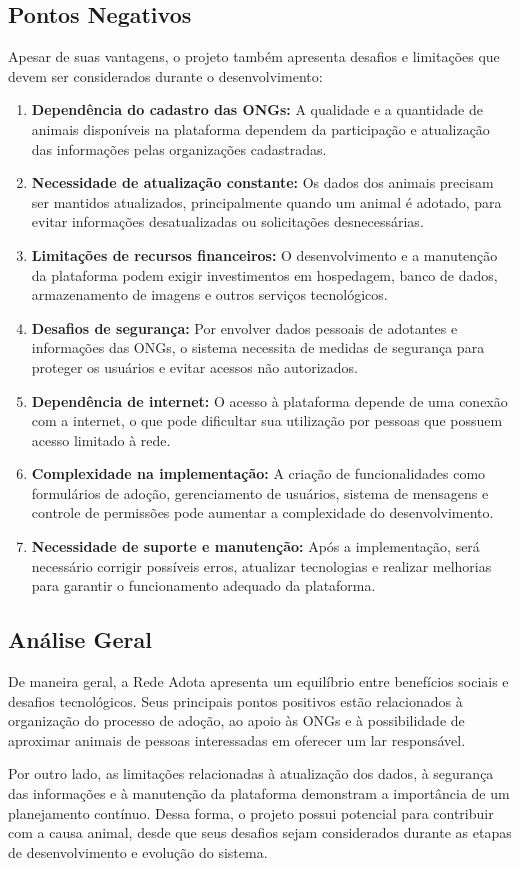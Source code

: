 \documentclass[12pt,a4paper]{article}
\begin{document}
\subsection{Pontos Negativos}
Apesar de suas vantagens, o projeto também apresenta desafios e limitações que devem ser considerados durante o desenvolvimento:
\begin{enumerate}[leftmargin=*]
    \item \textbf{Dependência do cadastro das ONGs:} A qualidade e a quantidade de animais disponíveis na plataforma dependem da participação e atualização das informações pelas organizações cadastradas.
    \item \textbf{Necessidade de atualização constante:} Os dados dos animais precisam ser mantidos atualizados, principalmente quando um animal é adotado, para evitar informações desatualizadas ou solicitações desnecessárias.
    \item \textbf{Limitações de recursos financeiros:} O desenvolvimento e a manutenção da plataforma podem exigir investimentos em hospedagem, banco de dados, armazenamento de imagens e outros serviços tecnológicos.
    \item \textbf{Desafios de segurança:} Por envolver dados pessoais de adotantes e informações das ONGs, o sistema necessita de medidas de segurança para proteger os usuários e evitar acessos não autorizados.
    \item \textbf{Dependência de internet:} O acesso à plataforma depende de uma conexão com a internet, o que pode dificultar sua utilização por pessoas que possuem acesso limitado à rede.
    \item \textbf{Complexidade na implementação:} A criação de funcionalidades como formulários de adoção, gerenciamento de usuários, sistema de mensagens e controle de permissões pode aumentar a complexidade do desenvolvimento.
    \item \textbf{Necessidade de suporte e manutenção:} Após a implementação, será necessário corrigir possíveis erros, atualizar tecnologias e realizar melhorias para garantir o funcionamento adequado da plataforma.
\end{enumerate}

\subsection{Análise Geral}
De maneira geral, a Rede Adota apresenta um equilíbrio entre benefícios sociais e desafios tecnológicos. Seus principais pontos positivos estão relacionados à organização do processo de adoção, ao apoio às ONGs e à possibilidade de aproximar animais de pessoas interessadas em oferecer um lar responsável.

Por outro lado, as limitações relacionadas à atualização dos dados, à segurança das informações e à manutenção da plataforma demonstram a importância de um planejamento contínuo. Dessa forma, o projeto possui potencial para contribuir com a causa animal, desde que seus desafios sejam considerados durante as etapas de desenvolvimento e evolução do sistema.
\end{document}
